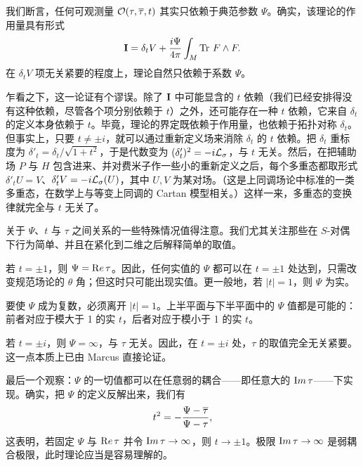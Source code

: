 我们断言，任何可观测量 ${\EUO}(\tau,\bar\tau,t)$ 其实只依赖于典范参数 $\Psi$。确实，该理论的作用量具有形式%
\setcounter{equation}{50}
\begin{equation}\label{eq:juty}
{{\cmmib I}}=\delta_tV
+{i\Psi\over 4\pi }\int_M\Tr \,F\wedge F.
\end{equation}
在 $\delta_tV$ 项无关紧要的程度上，理论自然只依赖于系数 $\Psi$。

乍看之下，这一论证有个谬误。除了 ${{\cmmib I}}$ 中可能显含的 $t$ 依赖（我们已经安排得没有这种依赖，尽管各个项分别依赖于 $t$）之外，还可能存在一种 $t$ 依赖，它来自 $\delta_t$ 的定义本身依赖于 $t$。毕竟，理论的界定既依赖于作用量，也依赖于拓扑对称 $\delta_t$。但事实上，只要 $t\not=\pm i$，就可以通过重新定义场来消除 $\delta_t$ 的 $t$ 依赖。把 $\delta_t$ 重标度为 $\delta'_t=\delta_t/\sqrt{1+t^2}$，于是代数变为 $(\delta'_t)^2=-i{{\lie}}_\sigma$，与 $t$ 无关。然后，在把辅助场 $P$ 与 $H$ 包含进来、并对费米子作一些小的重新定义之后，每个多重态都取形式 $\delta'_t U=V$、$\delta'_tV=-i{{\lie}}_\sigma(U)$，其中 $U,V$ 为某对场。（这是上同调场论中标准的一类多重态，在数学上与等变上同调的 Cartan 模型相关。）这样一来，多重态的变换律就完全与 $t$ 无关了。

\par{}

关于 $\Psi$、$t$ 与 $\tau$ 之间关系的一些特殊情况值得注意。我们尤其关注那些在 $S$-对偶下行为简单、并且在紧化到二维之后解释简单的取值。

若 $t=\pm 1$，则 $\Psi={\rm Re}\,\tau$。因此，任何实值的 $\Psi$ 都可以在 $t=\pm 1$ 处达到，只需改变规范场论的 $\theta$ 角；但这时只可能出现实值。更一般地，若 $|t|=1$，则 $\Psi$ 为实。

要使 $\Psi$ 成为复数，必须离开 $|t|=1$。上半平面与下半平面中的 $\Psi$ 值都是可能的：前者对应于模大于 1 的实 $t$，后者对应于模小于 1 的实 $t$。

若 $t=\pm i$，则 $\Psi=\infty$，与 $\tau$ 无关。因此，在 $t=\pm i$ 处，$\tau$ 的取值完全无关紧要。这一点本质上已由 Marcus \cite{ref53} 直接论证。

最后一个观察：$\Psi$ 的一切值都可以在任意弱的耦合——即任意大的 ${\rm Im}\,\tau$——下实现。确实，把 $\Psi$ 的定义反解出来，我们有
\setcounter{equation}{51}
\begin{equation}\label{eq:helmo}
t^2=-{\Psi-\bar\tau\over \Psi-\tau},
\end{equation}
这表明，若固定 $\Psi$ 与 ${\rm Re}\,\tau$ 并令 ${\rm Im}\,\tau\to\infty$，则 $t\to\pm 1$。极限 ${\rm Im}\,\tau\to\infty$ 是弱耦合极限，此时理论应当是容易理解的。

